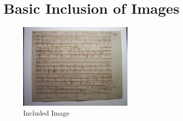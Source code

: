\documentclass{scrartcl}
\begin{document}
\section{Basic Inclusion of Images}

\Blindtext[1]

\begin{figure}[h]
\begin{center}
\includegraphics[width=0.5\textwidth]{media/schubert-d473}
\caption{Included Image}
\end{center}
\end{figure}

\Blindtext[1]
\end{document}
